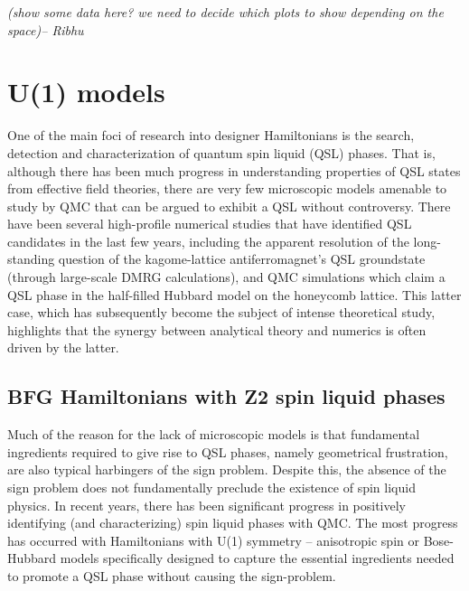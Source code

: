 \documentclass[aps,prb,groupedaddress,twocolumn]{revtex4}
\begin{document}
{\em (show some data here? we need to decide which plots to show
  depending on the space)-- Ribhu}
\section{U(1) models}

One of the main foci of research into designer Hamiltonians is the search, detection and characterization of quantum spin liquid (QSL) phases.  
That is, although there has been much progress in understanding properties of QSL states from effective field theories, there are very few microscopic models amenable to study by QMC that can be argued to exhibit a QSL without controversy.
There have been several high-profile numerical studies that have identified QSL candidates in the last few years, including the apparent resolution of the long-standing question of the kagome-lattice antiferromagnet's QSL groundstate (through large-scale DMRG calculations), and QMC simulations which claim a QSL phase in the half-filled Hubbard model on the honeycomb lattice.  This latter case, which has subsequently become the subject of intense theoretical study, highlights that the synergy between analytical theory and numerics is often driven by the latter.

\subsection{BFG\cite{BFG} Hamiltonians with Z2 spin liquid phases}

Much of the reason for the lack of microscopic models is that fundamental ingredients required to give rise to QSL phases, namely geometrical frustration, are also typical harbingers of the sign problem.  Despite this,  the absence of the sign problem does not fundamentally preclude the existence of spin liquid physics.  In recent years, there has been significant progress in positively identifying (and characterizing) spin liquid phases with QMC.  The most progress has occurred with Hamiltonians with U(1) symmetry -- anisotropic spin or Bose-Hubbard models specifically designed to capture the essential ingredients needed to promote a QSL phase without causing the sign-problem.

\end{document}
